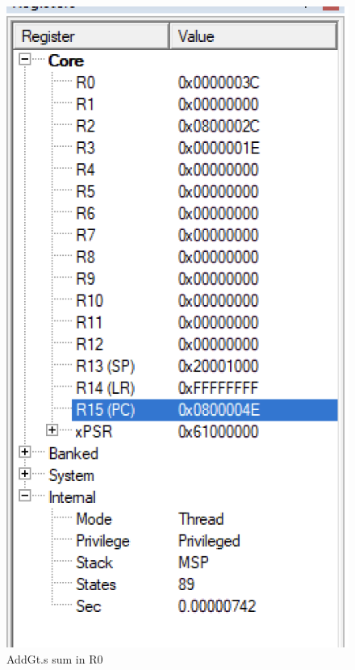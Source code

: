 \documentclass{article}
\begin{document}
\begin{figure}
\caption{AddGt.s sum in R0}
\centering
\includegraphics{../../Images/AddGt_sum_in_r0.png}
\end{figure}
\end{document}
